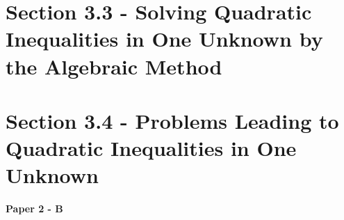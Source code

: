 \documentclass[12pt, a4paper]{article}
\begin{document}
\section*{Section 3.3 - Solving Quadratic Inequalities in One Unknown by the Algebraic Method \NF}\label{section:5-3-3}





\section*{Section 3.4 - Problems Leading to Quadratic Inequalities in One Unknown}\label{section:5-3-4}

\textbf{Paper 2 - B}
\begin{enumx}[label=\arabic*.,start=28]
\item {}\label{DSE2021-CoreP2-Q37} 
\end{enumx}
\end{document}
